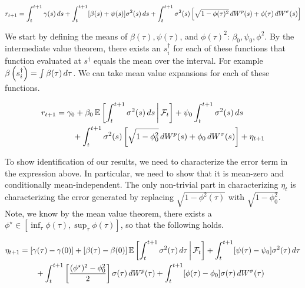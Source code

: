 \documentclass[11pt, letterpaper, twoside, final]{article}
\begin{document}
\begin{equation}
    r_{t+1} = \int_t^{t+1} \gamma(s) \mathop{}\!d s + \int_{t}^{t+1} [\beta(s) + \psi(s)] \sigma^2(s) \mathop{}\!d s +
    \int_t^{t+1} \sigma^2(s) \left[\sqrt{1 - \phi(\tau)^2} \mathop{}\!d W^{p}(s) + \phi(\tau) \mathop{}\!d W^{\sigma}(s)\right]
\end{equation}

We start by defining the means of $\beta(\tau), \psi(\tau)$, and $\phi(\tau)^2$: $\beta_0, \psi_0, \phi^2$.
By the intermediate value theorem, there exists an $s_i^{\dagger}$ for each of these functions that function
evaluated at $s^{\dagger}$ equals the mean over the interval.
For example $\beta\left(s_i^{\dagger}\right) = \int \beta(\tau) \mathop{}\!d \tau$.  
We can take mean value expansions for each of these functions.

\begin{equation}
    \label{eqn:price_decomp}
    \begin{alignedat}{1}
        r_{t+1} &= \gamma_0 + \beta_0 \operatorname{\mathbb{E}}\left[\int_t^{t+1} \sigma^2(s) \mathop{}\!d s \,\middle\vert\, \mathcal{F}_t\right] + \psi_0
            \int_{t}^{t+1} \sigma^2(s) \mathop{}\!d s  \\
        &\qquad + \int_t^{t+1} \sigma^2(s) \left[\sqrt{1 - \phi_0^2} \mathop{}\!d W^{p}(s) + \phi_0 \mathop{}\!d
        W^{\sigma}(s)\right] + \eta_{t+1} \\
    \end{alignedat}
\end{equation}

To show identification of our results, we need to characterize the error term in the expression above.
In particular, we need to show that it is mean-zero and conditionally mean-independent.
The only non-trivial part in characterizing $\eta_t$ is characterizing the error generated by replacing $\sqrt{1 -
\phi^2(\tau)}$ with $\sqrt{1 - \phi_0^2}$.
Note, we know by the mean value theorem, there exists a $\phi^{\star} \in [\inf_{\tau} \phi(\tau), \sup_{\tau}
\phi(\tau)]$, so that the following holds.

\begin{equation}
    \label{eqn:price_error_term}
    \begin{alignedat}{1}
        \eta_{t+1} &= [\gamma(\tau)  - \gamma(0)] + [\beta(\tau)  - \beta(0)] \operatorname{\mathbb{E}}\left[\int_t^{t+1} \sigma^2(\tau)
            \mathop{}\!d \tau \,\middle\vert\, \mathcal{F}_t\right] + \int_{t}^{t+1} [\psi(\tau) - \psi_0] \sigma^2(\tau) \mathop{}\!d \tau  \\
        &\qquad + \int_t^{t+1} \left[\frac{(\phi^{\star})^2 - \phi_0^2}{2}\right] \sigma(\tau) \mathop{}\!d W^{p}(\tau)
          + \int_t^{t+1} [\phi(\tau) - \phi_0] \sigma(\tau) \mathop{}\!d W^{\sigma}(\tau) \\
    \end{alignedat}
\end{equation}
\end{document}
